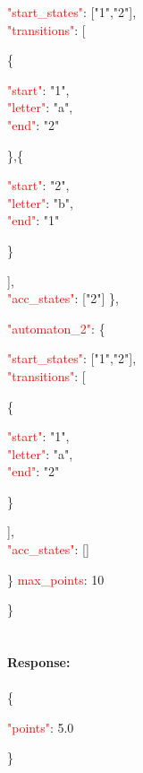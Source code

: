     \begin{adjustwidth}{7.5 mm}{0 cm}
     \begin{adjustwidth}{7.5 mm}{0 cm}
        \textcolor{red}{"start\_states"}: ["1","2"], \\
        \textcolor{red}{"transitions"}: [
        \begin{adjustwidth}{7.5 mm}{0 cm}
          \{
            \begin{adjustwidth}{7.5 mm}{0 cm}
            \textcolor{red}{"start"}: "1", \\
            \textcolor{red}{"letter"}: "a", \\
            \textcolor{red}{"end"}: "2" 
            \end{adjustwidth}
          \},\{ 
            \begin{adjustwidth}{7.5 mm}{0 cm}
            \textcolor{red}{"start"}: "2",\\
            \textcolor{red}{"letter"}: "b", \\
            \textcolor{red}{"end"}: "1"
            \end{adjustwidth}
          \}
        \end{adjustwidth}
        ],\\
        \textcolor{red}{"acc\_states"}: ["2"]
        \},
    \end{adjustwidth}
  \textcolor{red}{"automaton\_2"}: \{
  \begin{adjustwidth}{7.5 mm}{0 cm}
    \textcolor{red}{"start\_states"}: ["1","2"], \\
    \textcolor{red}{"transitions"}: [
    \begin{adjustwidth}{7.5 mm}{0 cm}
      \{
        \begin{adjustwidth}{7.5 mm}{0 cm}
        \textcolor{red}{"start"}: "1",\\
        \textcolor{red}{"letter"}: "a",\\
        \textcolor{red}{"end"}: "2"
        \end{adjustwidth}
      \}\\
      \end{adjustwidth}
    ],\\
    \textcolor{red}{"acc\_states"}: []
    \end{adjustwidth}
  \}
  \textcolor{red}{max\_points}: 10 
  \end{adjustwidth}
     \} \\
     \ \\
\ \\
\textbf{Response:}\\
\ \\
\{
    \begin{adjustwidth}{7.5 mm}{0 cm}
    \textcolor{red}{"points"}: 5.0
    \end{adjustwidth}
\}

